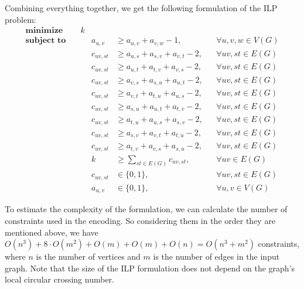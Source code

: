 Combining everything together, we get the following formulation of the ILP problem:
\begin{align}
    \textbf{minimize}\quad&k  \label{eq:ilp:objective}\\
    \textbf{subject to}\quad
    &&a_{u, v} &\geqslant a_{u, v} + a_{v, w} - 1,&&\forall u, v, w \in V(G)  \label{eq:ilp:con:transitivity}\\
    &&c_{uv, st} &\geqslant a_{u,s} + a_{s,v} + a_{v,t} - 2,&&\forall uv, st \in E(G)  \label{eq:ilp:con:cross-example}\\
    &&c_{uv, st} &\geqslant a_{u,t} + a_{t,v} + a_{v,s} - 2,&&\forall uv, st \in E(G) \label{eq:ilp:con:cross-begin}\\
    &&c_{uv, st} &\geqslant a_{v,s} + a_{s,u} + a_{u,t} - 2,&&\forall uv, st \in E(G)\\
    &&c_{uv, st} &\geqslant a_{v,t} + a_{t,u} + a_{u,s} - 2,&&\forall uv, st \in E(G)\\
    &&c_{uv, st} &\geqslant a_{s,u} + a_{u,t} + a_{t,v} - 2,&&\forall uv, st \in E(G)\\
    &&c_{uv, st} &\geqslant a_{t,u} + a_{u,s} + a_{s,v} - 2,&&\forall uv, st \in E(G)\\
    &&c_{uv, st} &\geqslant a_{s,v} + a_{v,t} + a_{t,u} - 2,&&\forall uv, st \in E(G)\\
    &&c_{uv, st} &\geqslant a_{t,v} + a_{v,s} + a_{s,u} - 2,&&\forall uv, st \in E(G)  \label{eq:ilp:con:cross-end}\\
    &&k &\geqslant \sum_{st \in E(G)} c_{uv, st},&&\forall uv \in E(G)  \label{eq:ilp:con:crossing-number}\\
    &&c_{uv, st} &\in \{0, 1\},&&\forall uv, st \in E(G)  \label{eq:ilp:con:cross-var}\\
    &&a_{u, v} &\in \{0, 1\},&&\forall u, v \in V(G)  \label{eq:ilp:con:order-var}
\end{align}

To estimate the complexity of the formulation, we can calculate the number of constraints used in the encoding. So considering them in the order they are mentioned above, we have \(O(n^3) + 8\cdot O(m^2) + O(m) + O(m) + O(n) = O(n^3 + m^2)\) constraints, where \(n\) is the number of vertices and \(m\) is the number of edges in the input graph. Note that the size of the ILP formulation does not depend on the graph's local circular crossing number.

